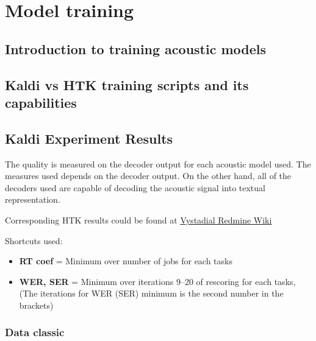 \chapter{Model training}
\label{cha:training}

\section{Introduction to training acoustic models} 
\label{sec:introduction_to_training_acoustic_models}



\section[Kaldi vs HTK]{Kaldi vs HTK training scripts and its capabilities} 
\label{sec:kaldi_htk}


\section{Kaldi Experiment Results} %
\label{sec:exp_results}

The quality is measured on the decoder output for each acoustic model used. The measures used depends on the decoder output. On the other hand, all of the decoders used are capable of decoding the acoustic signal into textual representation. 

Corresponding HTK results could be found at
\href{https://redmine.ms.mff.cuni.cz/projects/vystadial/wiki/Acoustic_models/} {Vystadial Redmine Wiki}

Shortcuts used:
\begin{itemize}
    \item {\bf RT coef} = Minimum over number of jobs for each tasks
    \item {\bf WER, SER} = Minimum over iterations 9--20 of rescoring for each tasks, 
        (The iterations for WER (SER) minimum is the second number in the brackets)
\end{itemize}

\subsection*{Data classic}

